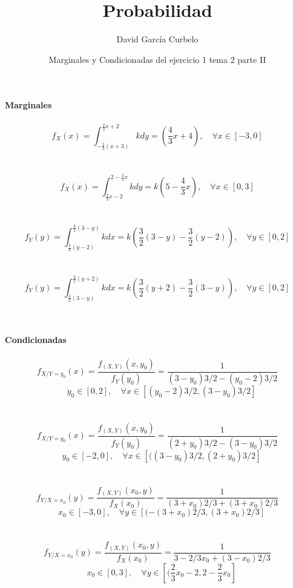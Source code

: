 \documentclass[a4paper, 12pt]{article}
\author{David García Curbelo}
\title{Probabilidad}
\date{Marginales y Condicionadas del ejercicio 1 tema 2 parte II}
\begin{document}
    \maketitle
    \setcounter{page}{1}
    \pagestyle{plain}

    {\bf{Marginales}}\\ \\
    $$f_X(x)=\int_{-\frac{2}{3}(x+3)}^{\frac{2}{3}x+ 2}k dy=
    \left(\frac{4}{3}x+4\right), \quad \forall x \in [-3,0]$$\\ \\
    
    $$f_X(x)=\int_{\frac{2}{3}x-2}^{2-\frac{2}{3}x}k dy=
    k\left(5-\frac{4}{3}x\right), \quad \forall x \in [0,3]$$\\ \\

    $$f_Y(y)=\int_{\frac{3}{2}(y-2)}^{\frac{3}{2}(3-y)}k dx =
    k\left(\frac{3}{2}(3-y)-\frac{3}{2}(y-2)\right), \quad \forall y \in [0,2] $$\\ \\

    $$f_Y(y)=\int_{\frac{3}{2}(3-y)}^{\frac{3}{2}(y+2)}k dx =
    k\left(\frac{3}{2}(y+2)-\frac{3}{2}(3-y)\right), \quad \forall y \in [0,2] $$\\ \\

    \newpage

    {\bf{Condicionadas}}\\ \\

        $$f_{X/Y=y_0}(x)=\frac{f_{(X,Y)}(x,y_0)}{f_Y(y_0)}=\frac{1}{(3-y_0)3/2 - (y_0-2)3/2}$$
        $$\quad y_0 \in [0,2], \quad \forall x \in \left[(y_0-2)3/2, (3-y_0)3/2\right]$$\\ \\

        $$f_{X/Y=y_0}(x)=\frac{f_{(X,Y)}(x,y_0)}{f_Y(y_0)}=\frac{1}{(2+y_0)3/2 - (3-y_0)3/2}$$
        $$\quad y_0 \in [-2,0], \quad \forall x \in \left[((3-y_0)3/2, (2+y_0)3/2\right]$$\\ \\

        $$f_{Y/X=x_0}(y)=\frac{f_{(X,Y)}(x_0,y)}{f_X(x_0)}=\frac{1}{(3+x_0)2/3 + (3+x_0)2/3}$$
        $$\quad x_0 \in [-3,0], \quad \forall y \in \left[(-(3+x_0)2/3, (3+x_0)2/3\right]$$\\ \\

        $$f_{Y/X=x_0}(y)=\frac{f_{(X,Y)}(x_0,y)}{f_X(x_0)}=\frac{1}{3-2/3x_0 + (3-x_0)2/3}$$
        $$\quad x_0 \in [0,3], \quad \forall y \in \left[(\frac{2}{3}x_0-2, 2-\frac{2}{3}x_0\right]$$\\ \\
\end{document}
